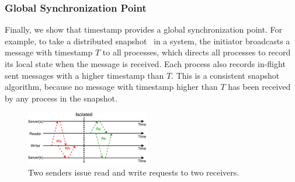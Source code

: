 \subsubsection{Global Synchronization Point}

Finally, we show that \sys{} timestamp provides a global synchronization point.
For example, to take a distributed snapshot~\cite{chandy1985distributed} in a \sys{} system, the initiator broadcasts a message with timestamp $T$ to all processes, which directs all processes to record its local state when the message is received. Each process also records in-flight sent messages with a higher timestamp than $T$.
This is a consistent snapshot algorithm, because no message with timestamp higher than $T$ has been received by any process in the snapshot.



\iffalse
\begin{figure}[t]
\centering
\includegraphics[width=0.48\textwidth]{images/read_write_isolation.pdf}
\caption{Two senders issue read and write requests to two receivers.}
\label{fig:example}
\end{figure}



